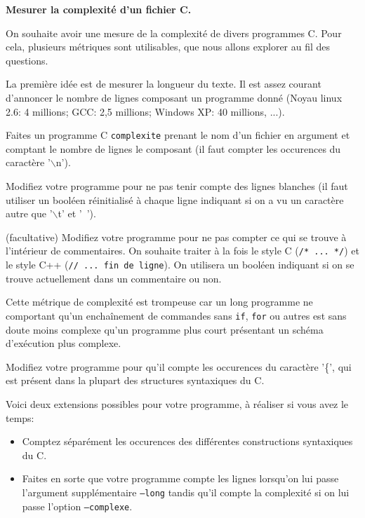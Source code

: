 \documentclass[10pt]{article}\usepackage[correction,nu]{esial}
\begin{document}
\begin{Exercice}\textbf{Mesurer la complexité d'un fichier C.}

On souhaite avoir une mesure de la complexité de divers programmes C.
Pour cela, plusieurs métriques sont utilisables, que nous allons explorer au
fil des questions.

La première idée est de mesurer la longueur du texte. Il est assez courant
d'annoncer le nombre de lignes composant un programme donné (Noyau linux 2.6: 4
millions; GCC: 2,5 millions; Windows XP: 40 millions, ...).

\Question Faites un programme C \texttt{complexite} prenant le nom d'un fichier
en argument et comptant le nombre de lignes le composant (il faut compter les
occurences du caractère '$\backslash$n').

\Question Modifiez votre programme pour ne pas tenir compte des lignes blanches
(il faut utiliser un booléen réinitialisé à chaque ligne indiquant si on a vu
un caractère autre que '$\backslash$t' et '~').

\Question (facultative) Modifiez votre programme pour ne pas compter ce qui se
trouve à l'intérieur de commentaires. On souhaite traiter à la fois le style C
(\texttt{/* ... */}) et le style C++ (\texttt{// ... fin de ligne}). On
utilisera un booléen indiquant si on se trouve actuellement dans un commentaire
ou non.

\bigskip

Cette métrique de complexité est trompeuse car un long programme ne comportant
qu'un enchaînement de commandes sans \texttt{if}, \texttt{for} ou autres est
sans doute moins complexe qu'un programme plus court présentant un schéma
d'exécution plus complexe. 

\Question Modifiez votre programme pour qu'il compte les occurences du
caractère '\{', qui est présent dans la plupart des structures syntaxiques du
C. 

\Question Voici deux extensions possibles pour votre programme, à réaliser si
vous avez le temps:
\begin{itemize}
\item Comptez séparément les occurences des différentes constructions
  syntaxiques du C.%
\item Faites en sorte que votre programme compte les lignes lorsqu'on lui passe
  l'argument supplémentaire \texttt{--long} tandis qu'il compte la complexité
  si on lui passe l'option \texttt{--complexe}. 
\end{itemize}
\end{Exercice}
\end{document}
